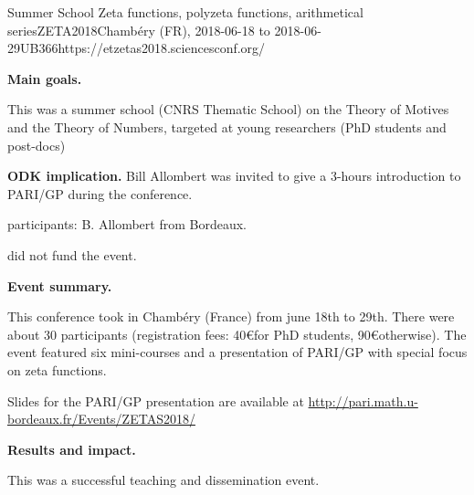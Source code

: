 \begin{event}{Summer School Zeta functions, polyzeta functions, arithmetical
  series}{ZETA2018}{Chamb\'ery (FR),
  2018-06-18 to 2018-06-29}{UB}{36}{6}{https://etzetas2018.sciencesconf.org/}

\textbf{Main goals.}

  This was a summer school (CNRS Thematic School) on the Theory of Motives and
  the Theory of Numbers, targeted at young researchers (PhD students and
  post-docs)

\textbf{ODK implication.} 
Bill Allombert was invited to give a 3-hours introduction to PARI/GP during
the conference.

\ODK participants: B. Allombert from Bordeaux.

\ODK did not fund the event.

\textbf{Event summary.} 

  This conference took in Chamb\'ery (France) from june 18th to
29th. There were about 30 participants (registration fees: 40\euro for PhD
  students, 90\euro otherwise). The event
  featured six mini-courses and a presentation of PARI/GP with special focus
  on zeta functions.

Slides for the PARI/GP presentation are available at
\url{http://pari.math.u-bordeaux.fr/Events/ZETAS2018/}

\textbf{Results and impact.} 

This was a successful teaching and dissemination event.
\end{event}
